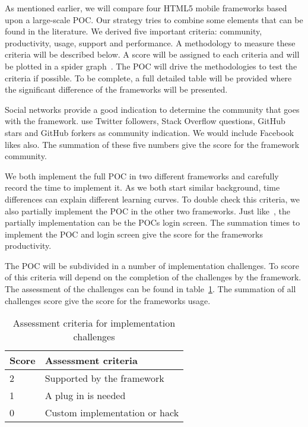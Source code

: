 \documentclass[a4paper]{artikel3}
\renewcommand{\paragraph}[1]{\vspace{2mm} \noindent {\bf #1}  }
\begin{document}
As mentioned earlier,  we will compare four HTML5 mobile frameworks based upon a large-scale POC.  
Our strategy tries to combine some elements that can be found in the literature.  
We derived five important criteria:  community,  productivity,  usage,  support and performance.  
A methodology to measure these criteria will be described below.  
A score will be assigned to each criteria and will be plotted in a spider graph~\cite{Few2005}.   
The POC will drive the methodologies to test the criteria if possible.  
To be complete,  a full detailed table will be provided where the significant difference of the frameworks will be presented. 	

\paragraph{Community}
Social networks provide a good indication to determine the community that goes with the framework.  
\cite{Sarrafi2012a,Ayuso2012} use Twitter followers,  Stack Overflow questions,  GitHub stars and GitHub forkers as community indication.  
We would include Facebook likes also.  The summation of these five numbers give the score for the framework community.  

\paragraph{Productivity}
We both implement the full POC in two different frameworks and carefully record the time to implement it.  
As we both start similar background,  time differences can explain different learning curves.  
To double check this criteria,  we also partially implement the POC in the other two frameworks.  
Just like~\cite{Burris},  the partially implementation can be the POCs login screen.  
The summation times to implement the POC and login screen give the score for the frameworks productivity.  

\paragraph{Usage}
The POC will be subdivided in a number of implementation challenges.  
To score of this criteria will depend on the completion of the challenges by the framework.  
The assessment of the challenges can be found in table~\ref{table:challenges-scores}.  
The summation of all challenges score give the score for the frameworks usage.

\begin{table}[h]
\centering
\begin{tabular}{l|l}
\textbf{Score} & \textbf{Assessment criteria}\\
  \hline \hline
2 & Supported by the framework\\
1 & A plug in is needed\\
0 & Custom implementation or hack\\
\end{tabular}
\caption{Assessment criteria for implementation challenges}
\label{table:challenges-scores}
\end{table}
\end{document}
